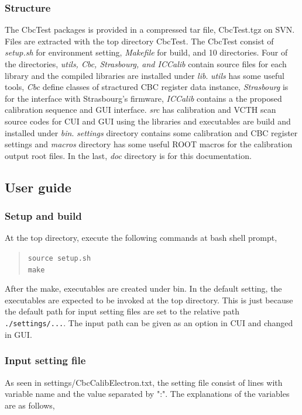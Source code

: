 \documentclass[11pt,a4paper]{article}
\begin{document}
	\subsubsection{Structure}
	The CbcTest packages is provided in a compressed tar file, CbcTest.tgz on SVN. Files are extracted with the top directory CbcTest. 
	The CbcTest consist of {\it setup.sh} for environment setting, {\it Makefile} for build, and 10 directories.  
	Four of the directories, {\it utils, Cbc, Strasbourg, and ICCalib} contain source files for each library and the compiled libraries are installed under {\it lib}.
{\it utils} has some useful tools, {\it Cbc} define classes of stractured CBC register data instance, {\it Strasbourg}  is for the interface with Strasbourg's firmware, {\it ICCalib} contains a the proposed calibration sequence and GUI interface.  
{\it src} has calibration and VCTH scan source codes for CUI and GUI using the libraries and executables are build and installed under {\it bin}. 
{\it settings} directory contains some calibration and CBC register settings and {\it macros} directory has some useful ROOT macros for the calibration output root files. 
In the last, {\it doc} directory is for this documentation.   

\subsection{User guide}

\subsubsection{Setup and build}

At the top directory, execute the following commands at bash shell prompt, 
   \begin{quote}
   \verb|source setup.sh|\\
	   \verb|make|
	   \end{quote}
	   After the make, executables are created under bin. In the default setting, the executables are expected to be invoked at the top directory.
	   This is just because the default path for input setting files are set to the relative path \verb|./settings/...|.  The input path can be given as an option
	   in CUI and changed in GUI.

	   \subsubsection{Input setting file}
	   As seen in settings/CbcCalibElectron.txt, the setting file consist of lines with variable name and the value separated by ":".
	   The explanations of the variables are as follows,
\end{document}
